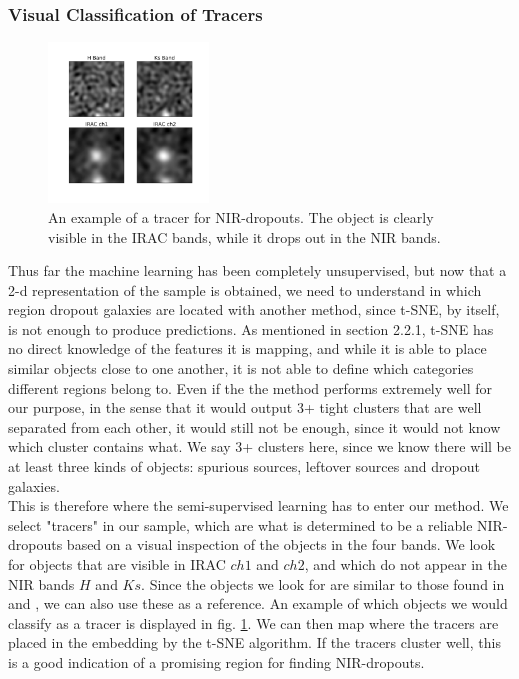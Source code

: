 \subsubsection{Visual Classification of Tracers}
\begin{figure}
    \centering %
    \includegraphics[trim={1cm 2.5cm 2cm 1.5cm},clip,width=0.38\textwidth]{Code/Saved_Figures/good_example.pdf}
    \caption{An example of a tracer for NIR-dropouts. The object is clearly visible in the IRAC bands, while it drops out in the NIR bands.}
    \label{tracer_example}  
\end{figure}
Thus far the machine learning has been completely unsupervised, but now that a 2-d representation of the sample is obtained, we need to understand in which region dropout galaxies are located with another method, since t-SNE, by itself, is not enough to produce predictions. As mentioned in section 2.2.1, t-SNE has no direct knowledge of the features it is mapping, and while it is able to place similar objects close to one another, it is not able to define which categories different regions belong to. Even if the the method performs extremely well for our purpose, in the sense that it would output 3+ tight clusters that are well separated from each other, it would still not be enough, since it would not know which cluster contains what. We say 3+ clusters here, since we know there will be at least three kinds of objects: spurious sources, leftover sources and dropout galaxies. \\
This is therefore where the semi-supervised learning has to enter our method. We select "tracers" in our sample, which are what is determined to be a reliable NIR-dropouts based on a visual inspection of the objects in the four bands. We look for objects that are visible in IRAC $ch1$ and $ch2$, and which do not appear in the NIR bands $H$ and $Ks$. Since the objects we look for are similar to those found in \cite{Alcalde_Pampliega_2019} and \cite{Wang_2019}, we can also use these as a reference. An example of which objects we would classify as a tracer is displayed in fig. \ref{tracer_example}. We can then map where the tracers are placed in the embedding by the t-SNE algorithm. If the tracers cluster well, this is a good indication of a promising region for finding NIR-dropouts. \\
